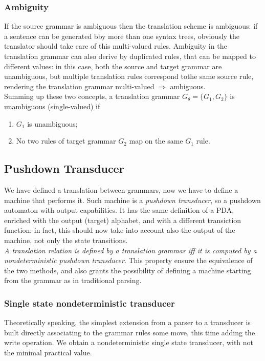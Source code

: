 \documentclass[10pt,a4paper]{article}
\begin{document}
				\subsubsection{Ambiguity}
					If the source grammar is ambiguous then the translation scheme is ambiguous: if a sentence can be generated bby more than one syntax trees, obviously the translator should take care of this multi-valued rules. Ambiguity in the translation grammar can also derive by duplicated rules, that can be mapped to different values: in this case, both the source and target grammar are unambiguous, but multiple translation rules correspond tothe same source rule, rendering the translation grammar multi-valued $\Rightarrow$ ambiguous.\\
					Summing up these two concepts, a translation grammar $ G_\theta = \{ G_1 , G_2\}$ is unambiguous (single-valued) if 
					\begin{enumerate}
						\item $G_1$ is unambiguous;
						\item No two rules of target grammar $G_2$ map on the same $G_1$ rule.
					\end{enumerate}
			
			\subsection{Pushdown Transducer}
				We have defined a translation between grammars, now we have to define a machine that performs it. Such machine is a \emph{pushdown transducer}, so a pushdown automaton with output capabilities. It has the same definition of a PDA, enriched with the output (target) alphabet, and with a different transiction function: in fact, this should now take into account also the output of the machine, not only the state transitions.\\
				\emph{A translation relation is defined by a translation grammar iff it is computed by a nondeterministic pushdown transducer}. This property ensure the equivalence of the two methods, and also grants the possibility of defining a machine starting from the grammar as in traditional parsing. 
				
				\subsubsection{Single state nondeterministic transducer}
					Theoretically speaking, the simplest extension from a parser to a transducer is built directly associating to the grammar rules some move, this time adding the write operation. We obtain a nondeterministic single state transducer, with not the minimal practical value.
				
\end{document}
